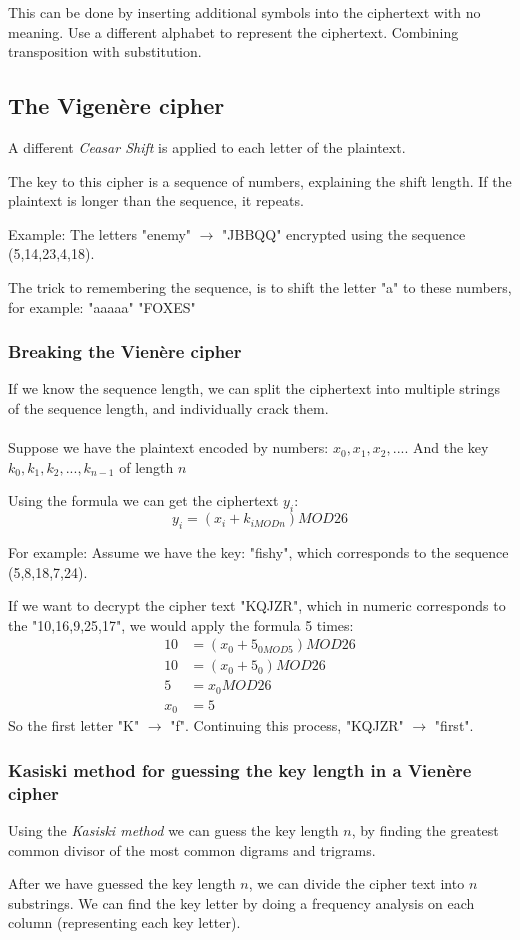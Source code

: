 \documentclass{article}
\begin{document}
	This can be done by inserting additional symbols into the ciphertext with no meaning. Use a different alphabet to represent the ciphertext. Combining transposition with substitution. 
	
	\subsection*{The Vigenère cipher}
	A different \textit{Ceasar Shift} is applied to each letter of the plaintext.
	
	The key to this cipher is a sequence of numbers, explaining the shift length. If the plaintext is longer than the sequence, it repeats. 
	
	Example: The letters "enemy" $\rightarrow$ "JBBQQ" encrypted using the sequence (5,14,23,4,18). 
	
	The trick to remembering the sequence, is to shift the letter "a" to these numbers, for example: "aaaaa"  "FOXES"	
	
	\subsubsection*{Breaking the Vienère cipher}
	If we know the sequence length, we can split the ciphertext into multiple strings of the sequence length, and individually crack them.  
	\\\\
	Suppose we have the plaintext encoded by numbers: $x_0,x_1,x_2,...$. And the key $k_0,k_1,k_2,...,k_{n-1}$ of length $n$  
	
	Using the formula we can get the ciphertext $y_i$:
	$$
	y_i = (x_i + k_{i MOD n}) MOD 26
	$$
	
	For example:
	Assume we have the key: "fishy", which corresponds to the sequence (5,8,18,7,24). 
	
	If we want to decrypt the cipher text "KQJZR", which in numeric corresponds to the "10,16,9,25,17", we would apply the formula 5 times:
	\[
	\begin{split}
		10 	&= (x_0 + 5_{0 MOD 5}) MOD 26 \\
		10	&= (x_0 + 5_0) MOD 26 \\
		5	&= x_0 MOD 26 \\
		x_0 &= 5
	\end{split}
	\]
	So the first letter "K" $\rightarrow$ "f". Continuing this process, "KQJZR" $\rightarrow$ "first".
	
	\subsubsection*{Kasiski method for guessing the key length in a Vienère cipher}
	Using the \textit{Kasiski method} we can guess the key length $n$, by finding the greatest common divisor of the most common digrams and trigrams.
	
	After we have guessed the key length $n$, we can divide the cipher text into $n$ substrings. We can find the key letter by doing a frequency analysis on each column (representing each key letter). 
		
\end{document}
